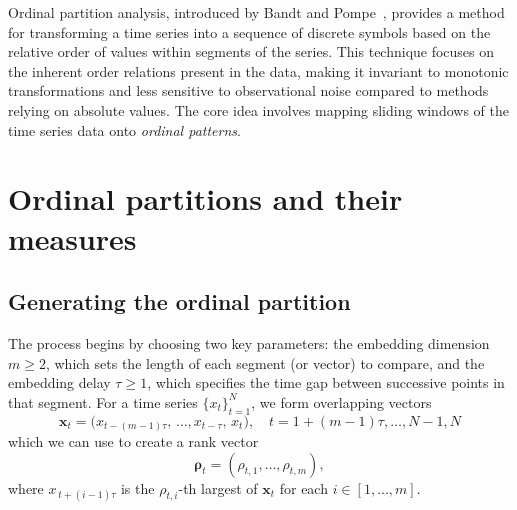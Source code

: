 








Ordinal partition analysis, introduced by Bandt and Pompe~\cite{bandt_pompe_2002}, provides a method for transforming a time series into a sequence of discrete symbols based on the relative order of values within segments of the series. This technique focuses on the inherent order relations present in the data, making it invariant to monotonic transformations and less sensitive to observational noise compared to methods relying on absolute values. The core idea involves mapping sliding windows of the time series data onto \emph{ordinal patterns}.

\section{Ordinal partitions and their measures}

\subsection{Generating the ordinal partition}

The process begins by choosing two key parameters: the embedding dimension $m\ge2$, which sets the length of each segment (or vector) to compare, and the embedding delay $\tau\ge1$, which specifies the time gap between successive points in that segment. For a time series $\{x_t\}_{t=1}^N$, we form overlapping vectors
\[
\mathbf{x}_t = \bigl(x_{t-(m-1)\tau},\,\dots,x_{t-\tau},\,x_t\bigr),
\quad t=1+(m-1)\tau,\dots,N-1,N
\]
which we can use to create a rank vector 
\[
  \mathbf{\rho}_t = (\rho_{t,1},\dots,\rho_{t,m}),
\]
where $x_{\,t+(i-1)\tau}$ is the $\rho_{t,i}$-th largest of $\mathbf{x}_t$ for each $i \in [1,...,m]$.

